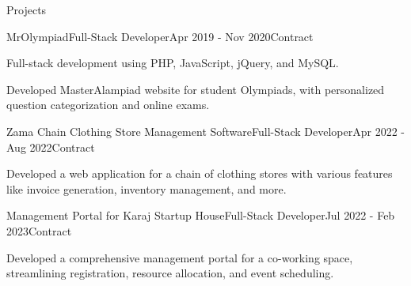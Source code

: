 \documentclass[]{kyvernitis-resume}
\begin{document}
\begin{section}{Projects}
\begin{subsection}{MrOlympiad}{Full-Stack Developer}{Apr 2019 - Nov 2020}{Contract}
\item Full-stack development using PHP, JavaScript, jQuery, and MySQL.
\item Developed MasterAlampiad website for student Olympiads, with personalized question categorization and online exams.
\end{subsection}
\begin{subsection}{Zama Chain Clothing Store Management Software}{Full-Stack Developer}{Apr 2022 - Aug 2022}{Contract}
\item Developed a web application for a chain of clothing stores with various features like invoice generation, inventory management, and more.
\end{subsection}

\begin{subsection}{Management Portal for Karaj Startup House}{Full-Stack Developer}{Jul 2022 - Feb 2023}{Contract}
 		\item Developed a comprehensive management portal for a co-working space, streamlining registration, resource allocation, and event scheduling.
\end{subsection}


    \end{section}


\end{document}
